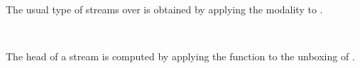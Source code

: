\begin{code}%
\>[0]\AgdaSpace{}%
\AgdaSymbol{:}\AgdaSpace{}%
\AgdaSymbol{\{}\AgdaSpace{}%
\AgdaSymbol{:}\AgdaSpace{}%
\AgdaSpace{}%
\AgdaSymbol{\}}\AgdaSpace{}%
\AgdaSymbol{\{}\AgdaSpace{}%
\AgdaSymbol{:}\AgdaSpace{}%
\AgdaSpace{}%
\AgdaSymbol{\}}\AgdaSpace{}%
\AgdaSpace{}%
\AgdaSpace{}%
\AgdaSpace{}%
\AgdaSymbol{(}\AgdaSpace{}%
\AgdaSymbol{)}\AgdaSpace{}%
\AgdaSpace{}%
\AgdaSpace{}%
\AgdaSpace{}%
\AgdaSymbol{(}\AgdaSpace{}%
\AgdaSymbol{(}\AgdaSpace{}%
\AgdaSymbol{))}\<%
\\
\>[0]\AgdaSpace{}%
\AgdaSymbol{\{}\AgdaSymbol{\}\{}\AgdaSymbol{\}}\AgdaSpace{}%
\AgdaSpace{}%
\AgdaSymbol{=}\AgdaSpace{}%
\AgdaSpace{}%
\AgdaSymbol{(}\AgdaSpace{}%
\AgdaSymbol{((}\AgdaSpace{}%
\AgdaSymbol{(}\AgdaSpace{}%
\AgdaSymbol{))}\AgdaSpace{}%
\AgdaSpace{}%
\AgdaSymbol{(}\AgdaSpace{}%
\AgdaSymbol{))}\AgdaSpace{}%
\AgdaSymbol{)}\<%
\end{code}
The usual type of streams over  is obtained by applying the  modality to  .
\begin{code}%
\>[0]\AgdaSpace{}%
\AgdaSymbol{:}\AgdaSpace{}%
\AgdaSpace{}%
\AgdaSpace{}%
\AgdaSpace{}%
\AgdaSpace{}%
\<%
\\
\>[0]\AgdaSpace{}%
\AgdaSpace{}%
\AgdaSymbol{=}\AgdaSpace{}%
\AgdaSpace{}%
\AgdaSymbol{(}\AgdaSpace{}%
\AgdaSymbol{)}\<%
\end{code}
The head of a stream  is computed by applying the function  to the unboxing of .
